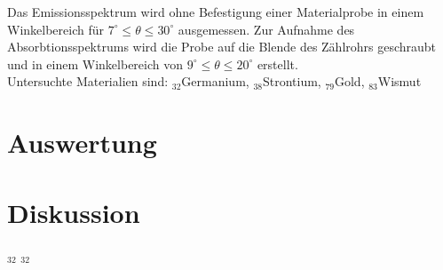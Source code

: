 Das Emissionsspektrum wird ohne Befestigung einer Materialprobe in einem Winkelbereich für $7^\circ \le \theta \le 30^\circ$ ausgemessen.
Zur Aufnahme des Absorbtionsspektrums wird die Probe auf die Blende des Zählrohrs geschraubt und in einem Winkelbereich von
$9^\circ \le \theta \le 20^\circ$ erstellt.\\
Untersuchte Materialien sind: $_{32}$Germanium, $_{38}$Strontium, $_{79}$Gold, $_{83}$Wismut

\section{Auswertung}

\section{Diskussion}

$_{32}$
$_{32}$



